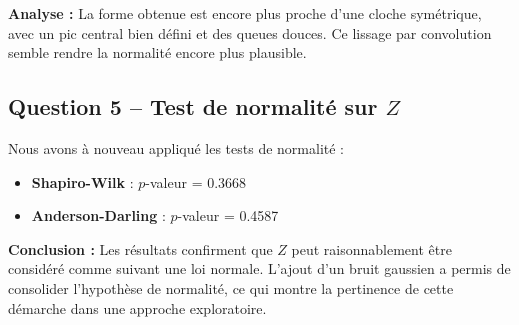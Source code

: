 \documentclass[a4paper,11pt]{article}
\begin{document}
\textbf{Analyse :} La forme obtenue est encore plus proche d’une cloche symétrique, avec un pic central bien défini et des queues douces. Ce lissage par convolution semble rendre la normalité encore plus plausible.

\subsection*{Question 5 – Test de normalité sur $Z$}
Nous avons à nouveau appliqué les tests de normalité :

\begin{itemize}
    \item \textbf{Shapiro-Wilk} : $p$-valeur = 0.3668
    \item \textbf{Anderson-Darling} : $p$-valeur = 0.4587
\end{itemize}

\textbf{Conclusion :} Les résultats confirment que $Z$ peut raisonnablement être considéré comme suivant une loi normale. L’ajout d’un bruit gaussien a permis de consolider l’hypothèse de normalité, ce qui montre la pertinence de cette démarche dans une approche exploratoire.
\end{document}
